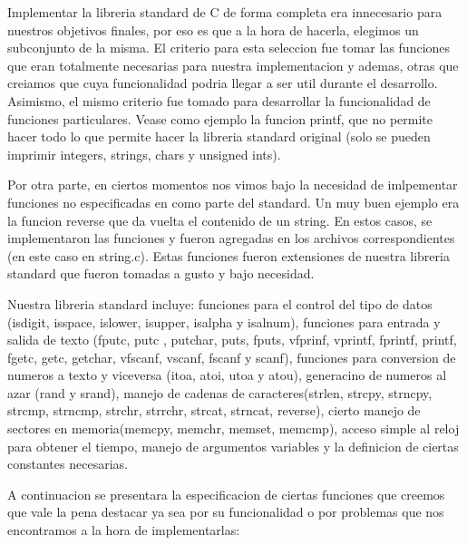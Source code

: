 \documentclass[a4paper,10pt]{article}
\begin{document}
    Implementar la libreria standard de C de forma completa era innecesario para nuestros objetivos finales, por eso es que a la hora de hacerla, elegimos un subconjunto de la misma. El criterio para esta seleccion fue tomar las funciones que eran totalmente necesarias para nuestra implementacion y ademas, otras que creiamos que cuya funcionalidad podria llegar a ser util durante el desarrollo.
    Asimismo, el mismo criterio fue tomado para desarrollar la funcionalidad de funciones particulares. Vease como ejemplo la funcion printf, que no permite hacer todo lo que permite hacer la libreria standard original (solo se pueden imprimir integers, strings, chars y unsigned ints).

    Por otra parte, en ciertos momentos nos vimos bajo la necesidad de imlpementar funciones no especificadas en como parte del standard. Un muy buen ejemplo era la funcion reverse que da vuelta el contenido de un string. En estos casos, se implementaron las funciones y fueron agregadas en los archivos correspondientes (en este caso en string.c). Estas funciones fueron extensiones de nuestra libreria standard que fueron tomadas a gusto y bajo necesidad.

    Nuestra libreria standard incluye: funciones para el control del tipo de datos (isdigit, isspace, islower, isupper, isalpha y isalnum), funciones para entrada y salida de texto (fputc, putc , putchar, puts, fputs, vfprinf, vprintf, fprintf, printf, fgetc, getc, getchar, vfscanf, vscanf, fscanf y scanf), funciones para conversion de numeros a texto y viceversa (itoa, atoi, utoa y atou), generacino de numeros al azar (rand y srand), manejo de cadenas de caracteres(strlen, strcpy, strncpy, strcmp, strncmp, strchr, strrchr, strcat, strncat, reverse), cierto manejo de sectores en memoria(memcpy, memchr, memset, memcmp), acceso simple al reloj para obtener el tiempo, manejo de argumentos variables y la definicion de ciertas constantes necesarias.

    A continuacion se presentara la especificacion de ciertas funciones que creemos que vale la pena destacar ya sea por su funcionalidad o por problemas que nos encontramos a la hora de implementarlas:
\end{document}
